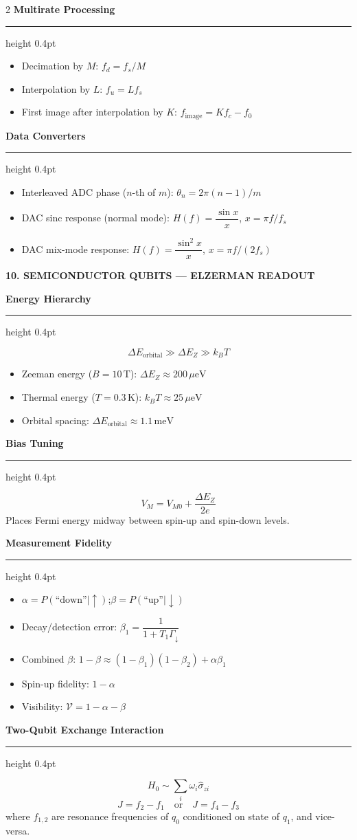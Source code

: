 \documentclass[10pt,a4paper]{article}
\newcommand{\sectionbox}[1]{%
  \vspace{3pt}%
  \noindent\colorbox{headerbg}{\parbox{\linewidth-2\fboxsep}%
    {\bfseries\small\color{white}\MakeUppercase{#1}}}%
  \vspace{1pt}%
}
\newcommand{\subsec}[1]{%
  \vspace{3pt}%
  {\small\bfseries\color{subseccolor}#1}%
  \vspace{1pt}\hrule height 0.4pt \vspace{2pt}%
}
\begin{document}
\begin{multicols}{2}
\subsec{Multirate Processing}
\begin{itemize}
  \item Decimation by $M$: $f_d=f_s/M$
  \item Interpolation by $L$: $f_u=Lf_s$
  \item First image after interpolation by $K$: $f_\text{image}=Kf_c-f_0$
\end{itemize}

\subsec{Data Converters}
\begin{itemize}
  \item Interleaved ADC phase ($n$-th of $m$): $\theta_n=2\pi(n-1)/m$
  \item DAC sinc response (normal mode): $H(f)=\dfrac{\sin x}{x}$,\; $x=\pi f/f_s$
  \item DAC mix-mode response: $H(f)=\dfrac{\sin^2 x}{x}$,\; $x=\pi f/(2f_s)$
\end{itemize}

\sectionbox{10. Semiconductor Qubits — Elzerman Readout}

\subsec{Energy Hierarchy}
\[
\Delta E_\text{orbital}\gg\Delta E_Z\gg k_BT
\]
\begin{itemize}
  \item Zeeman energy ($B=10\,\text{T}$): $\Delta E_Z\approx200\,\mu\text{eV}$
  \item Thermal energy ($T=0.3\,\text{K}$): $k_BT\approx25\,\mu\text{eV}$
  \item Orbital spacing: $\Delta E_\text{orbital}\approx1.1\,\text{meV}$
\end{itemize}

\subsec{Bias Tuning}
\[
V_M=V_{M0}+\frac{\Delta E_Z}{2e}
\]
Places Fermi energy midway between spin-up and spin-down levels.

\subsec{Measurement Fidelity}
\begin{itemize}
  \item $\alpha=P(\text{``down''}\mid\uparrow)$;\quad $\beta=P(\text{``up''}\mid\downarrow)$
  \item Decay/detection error: $\beta_1=\dfrac{1}{1+T_1\Gamma_\downarrow}$
  \item Combined $\beta$: $1-\beta\approx(1-\beta_1)(1-\beta_2)+\alpha\beta_1$
  \item Spin-up fidelity: $1-\alpha$
  \item Visibility: $\mathcal{V}=1-\alpha-\beta$
\end{itemize}

\subsec{Two-Qubit Exchange Interaction}
\[
H_0\sim\sum_i\omega_i\hat\sigma_{zi}
\]
\[
J=f_2-f_1\quad\text{or}\quad J=f_4-f_3
\]
where $f_{1,2}$ are resonance frequencies of $q_0$ conditioned on state of $q_1$, and vice-versa.

\end{multicols}
\end{document}
